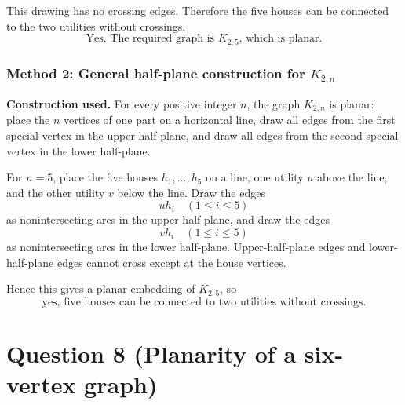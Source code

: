\documentclass[12pt]{article}
\begin{document}
\begin{center}
\end{center}

This drawing has no crossing edges. Therefore the five houses can be connected to the two utilities without crossings.
\[
\boxed{\text{Yes. The required graph is }K_{2,5}\text{, which is planar.}}
\]

\subsubsection{Method 2: General half-plane construction for $K_{2,n}$}
\textbf{Construction used.} For every positive integer $n$, the graph $K_{2,n}$ is planar: place the $n$ vertices of one part on a horizontal line, draw all edges from the first special vertex in the upper half-plane, and draw all edges from the second special vertex in the lower half-plane.

For $n=5$, place the five houses $h_1,\dots,h_5$ on a line, one utility $u$ above the line, and the other utility $v$ below the line. Draw the edges
\[
uh_i\quad (1\le i\le 5)
\]
as nonintersecting arcs in the upper half-plane, and draw the edges
\[
v h_i\quad (1\le i\le 5)
\]
as nonintersecting arcs in the lower half-plane. Upper-half-plane edges and lower-half-plane edges cannot cross except at the house vertices.

Hence this gives a planar embedding of $K_{2,5}$, so
\[
\boxed{\text{yes, five houses can be connected to two utilities without crossings.}}
\]

\newpage
\section{Question 8 (Planarity of a six-vertex graph)}
\end{document}
